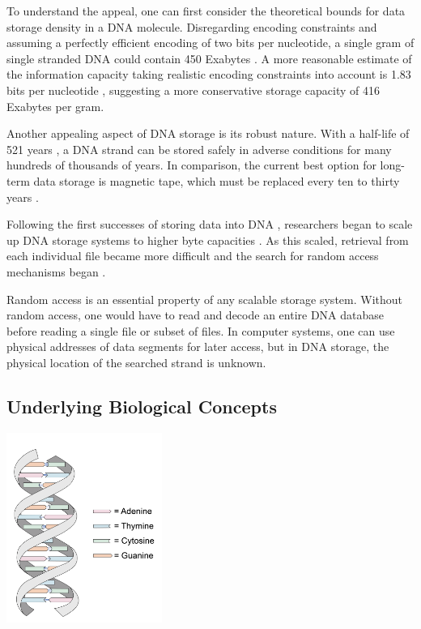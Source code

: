 \documentclass[a4paper,conference]{IEEEtran}
\begin{document}
To understand the appeal, one can first consider the theoretical bounds for data storage density in a DNA molecule. Disregarding encoding constraints and assuming a perfectly efficient encoding of two bits per nucleotide, a single gram of single stranded DNA could contain 450 Exabytes \cite{church_next-generation_2012}. A more reasonable estimate of the information capacity taking realistic encoding constraints into account is 1.83 bits per nucleotide \cite{wang_high_2019}, suggesting a more conservative storage capacity of 416 Exabytes per gram. 


Another appealing aspect of DNA storage is its robust nature. With a half-life of 521 years \cite{bornholt_dna-based_2016}, a DNA strand can be stored safely in adverse conditions for many hundreds of thousands of years. In comparison, the current best option for long-term data storage is magnetic tape, which must be replaced every ten to thirty years \cite{bornholt_dna-based_2016}.

Following the first successes of storing data into DNA \cite{gibson_creation_2010,church_next-generation_2012}, researchers began to scale up DNA storage systems to higher byte capacities \cite{bornholt_dna-based_2016}. As this scaled, retrieval from each individual file became more difficult \cite{bornholt_dna-based_2016} and the search for random access mechanisms began \cite{yazdi_rewritable_2015}. 

Random access is an essential property of any scalable storage system. Without random access, one would have to read and decode an entire DNA database before reading a single file or subset of files. In computer systems, one can use physical addresses of data segments for later access, but in DNA storage, the physical location of the searched strand is unknown. 


\subsection{Underlying Biological Concepts}

\begin{center}
\includegraphics[width=2in]{images/dna}
\end{center}
\end{document}
